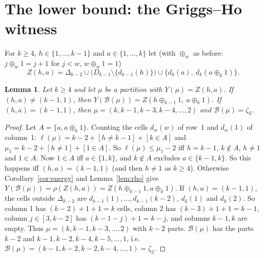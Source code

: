 \documentclass[11pt]{article}
\newtheorem{lemma}[theorem]{Lemma}
\theoremstyle{definition}
\newcommand{\B}{\mathcal{B}}
\renewcommand{\le}{\leqslant}
\renewcommand{\ge}{\geqslant}
\begin{document}
\section{The lower bound: the Griggs--Ho witness}\label{sec:c4lower}

For $k\ge4$, $h\in\{1,\dots,k-1\}$ and $a\in\{1,\dots,k\}$ let (with $\oplus_w$ as before: $j\oplus_w1=j+1$ for
$j<w$, $w\oplus_w1=1$)
\[Z(h,a)=\Delta_{k-2}\cup\bigl(D_{k-1}\setminus\{d_{k-1}(h)\}\bigr)\cup\{d_k(a),\ d_k(a\oplus_k1)\}.\]

\begin{lemma}\label{lem:c4conf}
Let $k\ge4$ and let $\mu$ be a partition with $Y(\mu)=Z(h,a)$.  If $(h,a)\ne(k-1,1)$, then
$Y(\B(\mu))=Z(h\oplus_{k-1}1,\ a\oplus_k1)$.  If $(h,a)=(k-1,1)$, then $\mu=(k,k-1,k-3,k-4,\dots,2)$ and
$\B(\mu)=\zeta_3$.
\end{lemma}
\begin{proof}
Let $A=\{a,a\oplus_k1\}$.  Counting the cells $d_w(w)$ of row~1 and $d_w(1)$ of column~1:
$\ell(\mu)=k-2+[h\ne k-1]+[k\in A]$ and $\mu_1=k-2+[h\ne1]+[1\in A]$.  So $\ell(\mu)\le\mu_1-2$ iff $h=k-1$,
$k\notin A$, $h\ne1$ and $1\in A$.  Now $1\in A$ iff $a\in\{1,k\}$, and $k\notin A$ excludes $a\in\{k-1,k\}$.  So this
happens iff $(h,a)=(k-1,1)$ (and then $h\ne1$ as $k\ge4$).  Otherwise Corollary~\ref{cor:energy} and
Lemma~\ref{lem:rho} give $Y(\B(\mu))=\rho(Z(h,a))=Z(h\oplus_{k-1}1,a\oplus_k1)$.
If $(h,a)=(k-1,1)$, the cells outside $\Delta_{k-2}$ are $d_{k-1}(1),\dots,d_{k-1}(k-2)$, $d_k(1)$ and $d_k(2)$.  So
column 1 has $(k-2)+1+1=k$ cells, column 2 has $(k-3)+1+1=k-1$, column $j\in[3,k-2]$ has $(k-1-j)+1=k-j$,
and columns $k-1,k$ are empty.  Thus $\mu=(k,k-1,k-3,\dots,2)$ with $k-2$ parts.  $\B(\mu)$ has the parts
$k-2$ and $k-1,k-2,k-4,k-5,\dots,1$, i.e.\ $\B(\mu)=(k-1,k-2,k-2,k-4,\dots,1)=\zeta_3$.
\end{proof}
\end{document}
